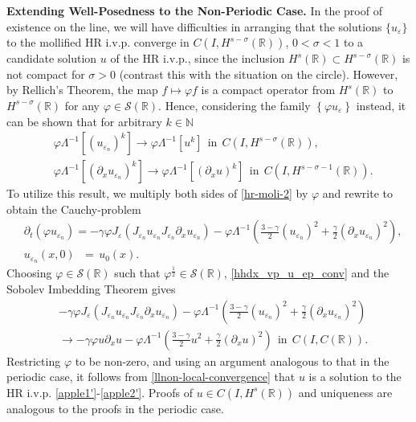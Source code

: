 \documentclass[12pt,reqno]{amsart}
\newcommand{\rr}{\mathbb{R}}
\newcommand{\p}{\partial}
\newcommand{\ee}{\varepsilon}
\newcommand{\vp}{\varphi}
\theoremstyle{plain}  %
\theoremstyle{definition}
\begin{document}
{\bf Extending Well-Posedness to the Non-Periodic Case.}
In the proof of existence on the line, we will have difficulties in 
arranging
that the solutions $\{u_\ee\}$ to the mollified HR i.v.p. converge in $C(I,
H^{s- \sigma}(\rr))$, $0 < \sigma < 1$ to a candidate solution $u$ of the 
HR i.v.p., since the inclusion $H^s(\rr) \subset H^{s-\sigma}(\rr)$ is not 
compact for $\sigma > 0$ (contrast this with the situation on the circle).  
However, by Rellich's Theorem, the map $f \mapsto \vp f$
is a compact operator from $H^s(\rr)$ to  $H^{s-\sigma}(\rr)$ for any $\vp 
\in \mathcal{S}(\rr)$.
Hence, considering the family $\left\{ \varphi
u_\ee \right\}$ instead, it can be shown that 
for arbitrary $k \in \mathbb{N}$
%
%
\begin{equation}
\begin{split}
& \vp \Lambda^{-1} [(u_{\ee_n})^k] \to \vp \Lambda^{-1} [u^k] \ \ \text{in}  \ \ C(I,
H^{s-\sigma }(\rr)),
\\
& \vp \Lambda^{-1} [(\p_x u_{\ee_n})^k] \to \vp \Lambda^{-1} [(\p_x u)^k] \ \
\text{in}  \ \ C(I,
H^{s-\sigma -1}(\rr)).
\label{hhdx_vp_u_ep_conv}
\end{split}
\end{equation}
%
%
%
%
To utilize this result, we multiply both sides of \eqref{hr-moli-2} by 
$\varphi$ and rewrite to obtain the Cauchy-problem
%
%
\begin{align}
\label{hh3}
 & \p_t(\vp u_{\ee_n} )  = -\gamma \vp J_\ee (J_{\ee_n} u_{\ee_n} 
J_{\ee_n} \p_x u_{\ee_n}) - \vp \Lambda^{-1} \left( \frac{3-\gamma}{2} 
(u_{\ee_n})^2
+ \frac{\gamma}{2} (\p_x u_{\ee_n})^2 \right ),
\\
& u_{\ee_n}(x, 0) \phantom{\,,} = \phantom{\,} u_0 (x).
\label{real-line-moli-data-2} 
\end{align}
%
%
Choosing $\vp \in \mathcal{S}(\rr)$ such that
$\vp^\frac{1}{2} \in \mathcal{S}(\rr)$, \eqref{hhdx_vp_u_ep_conv} and the 
Sobolev Imbedding Theorem
gives 
%
%
%
\begin{equation}
\begin{split}
	& -\gamma \vp J_\ee (J_{\ee_n} u_{\ee_n} 
J_{\ee_n} \p_x u_{\ee_n}) - \vp \Lambda^{-1} \left( \frac{3-\gamma}{2}
(u_{\ee_n})^2
+ \frac{\gamma}{2} (\p_x u_{\ee_n})^2 \right )
\\
& \to -\gamma \vp u \p_x u - \vp \Lambda^{-1} \left( \frac{3-\gamma}{2} u^2
+ \frac{\gamma}{2} (\p_x u)^2 \right ) \ \
\text{in} \ \ C(I, C(\rr)).
\label{llnon-local-convergence}
\end{split}
\end{equation}
%
%
%
Restricting $\vp$ to be non-zero, and using an argument analogous to that in the periodic case, it follows from 
\eqref{llnon-local-convergence} that $u$ is a solution to the HR i.v.p.
\eqref{apple1'}-\eqref{apple2'}. Proofs of 
$u \in C(I, H^s(\rr))$ and uniqueness are analogous to the proofs in 
the periodic case.
%
%
\end{document}
